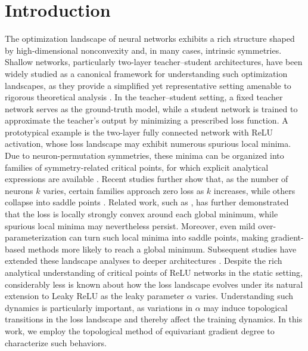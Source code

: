 \documentclass{amsart}%
\begin{document}
\section{Introduction}
The optimization landscape of neural networks exhibits a rich structure shaped by high-dimensional nonconvexity and, in many cases, intrinsic symmetries. Shallow networks, particularly two-layer teacher–student architectures, have been widely studied as a canonical framework for understanding such optimization landscapes, as they provide a simplified yet representative setting amenable to rigorous theoretical analysis \cite{akiyama2021learnability,arjevani2025geometry, du2018gradient, soltanolkotabi2018theoretical}. In the teacher–student setting, a fixed teacher network serves as the ground-truth model, while a student network is trained to approximate the teacher's output by minimizing a prescribed loss function.
A prototypical example is the two-layer fully connected network with ReLU activation, whose loss landscape may exhibit numerous spurious local minima. Due to neuron-permutation symmetries, these minima can be organized into families of symmetry-related critical points, for which explicit analytical expressions are available \cite{symmetry2021, safr}. Recent studies further show that, as the number of neurons $k$ varies, certain families approach zero loss as $k$ increases, while others collapse into saddle points \cite{arjevani2021analytic, arjevani2022annihilation}. Related work, such as \cite{safran2021effects}, has further demonstrated that the loss is locally strongly convex around each global minimum, while spurious local minima may nevertheless persist. Moreover, even mild over-parameterization can turn such local minima into saddle points, making gradient-based methods more likely to reach a global minimum. Subsequent studies have extended these landscape analyses to deeper architectures \cite{arjevani2021symmetry}. Despite the rich analytical understanding of critical points of ReLU networks in the static setting, considerably less is known about how the loss landscape evolves under its natural extension to Leaky ReLU as the leaky parameter \(\alpha\) varies. Understanding such dynamics is particularly important, as variations in \(\alpha\) may induce topological transitions in the loss landscape and thereby affect the training dynamics. In this work, we employ the topological method of equivariant gradient degree to characterize such behaviors.
\vskip0.3cm
\end{document}
